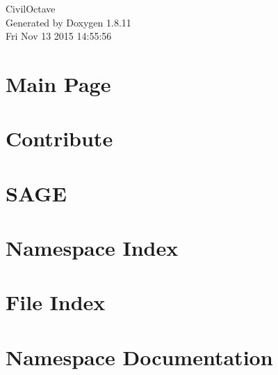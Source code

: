 \documentclass[twoside]{book}
\newcommand{\+}{\discretionary{\mbox{\scriptsize$\hookleftarrow$}}{}{}}
\newcommand{\clearemptydoublepage}{%
  \newpage{\pagestyle{empty}\cleardoublepage}%
}
\begin{document}
\hypersetup{pageanchor=false,
             bookmarks=true,
             bookmarksnumbered=true,
             pdfencoding=unicode
            }
\begin{titlepage}
\vspace*{7cm}
\begin{center}%
{\Large Civil\+Octave }\\
\vspace*{1cm}
{\large Generated by Doxygen 1.8.11}\\
\vspace*{0.5cm}
{\small Fri Nov 13 2015 14:55:56}\\
\end{center}
\end{titlepage}
\clearemptydoublepage
\tableofcontents
\clearemptydoublepage
{}
\hypersetup{pageanchor=true}

\chapter{Main Page}
\label{index}\hypertarget{index}{}
\chapter{Contribute}
\label{md__home_amarjeet_projects_CivilOctave_sage_Contribute}
\hypertarget{md__home_amarjeet_projects_CivilOctave_sage_Contribute}{}

\chapter{S\+A\+G\+E}
\label{md__home_amarjeet_projects_CivilOctave_sage_Readme}
\hypertarget{md__home_amarjeet_projects_CivilOctave_sage_Readme}{}

\chapter{Namespace Index}

\chapter{File Index}

\chapter{Namespace Documentation}














\end{document}
